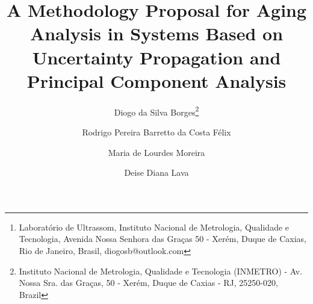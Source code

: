 \documentclass{ws-m3as}
\begin{document}
	

%
\catchline{}{}{}{}{}
%

\title{\textbf{A Methodology Proposal for Aging Analysis in Systems Based on Uncertainty Propagation and Principal Component Analysis}}

\author{Diogo da Silva Borges\footnote{Instituto Nacional de Metrologia, Qualidade e Tecnologia (INMETRO) - Av. Nossa Sra. das Graças, 50 - Xerém, Duque de Caxias - RJ, 25250-020, Brazil}}

\address{\textit{LABUS, INMETRO, Av. Nossa Sra. das Graças 50 - Xerém\\ 
Rio de Janeiro, Duque de Caxias 25250-020, Brazil \footnote{Laboratório de Ultrassom, Instituto Nacional de Metrologia, Qualidade e Tecnologia, Avenida Nossa Senhora das Graças 50 - Xerém, Duque de Caxias, Rio de Janeiro, Brasil, diogosb@outlook.com}}\\ diogosb@outlook.com}

\author{Rodrigo Pereira Barretto da Costa Félix}

\address{LABUS, INMETRO, Av. Nossa Sra. das Graças 50 - Xerém\\
Rio de Janeiro, Duque de Caxias 25250-020, Brazil\\
rpfelix@inmetro.gov.br}

\author{Maria de Lourdes Moreira}

\address{SETER, IEN, Rua Hélio de Almeida 75, Cidade Universitária - Ilha do Fundão\\
	Rio de Janeiro, Rio de Janeiro 21941-972, Brazil\\
	malu@ien.gov.br}

\author{Deise Diana Lava}

\address{INMETRO, Av. Nossa Sra. das Graças 50 - Xerém\\
Rio de Janeiro, Duque de Caxias 25250-020, Brazil\\
deise\_dy@hotmail.com}

\maketitle

\begin{history}
\end{history}
\end{document}
